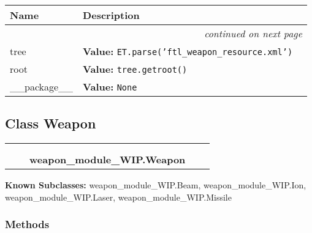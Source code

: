     \vspace{-1cm}
\hspace{\varindent}\begin{longtable}{|p{\varnamewidth}|p{\vardescrwidth}|l}
\cline{1-2}
\cline{1-2} \centering \textbf{Name} & \centering \textbf{Description}& \\
\cline{1-2}
\endhead\cline{1-2}\multicolumn{3}{r}{\small\textit{continued on next page}}\\\endfoot\cline{1-2}
\endlastfoot\raggedright t\-r\-e\-e\- & \raggedright \textbf{Value:} 
{\tt ET.parse('ftl\_weapon\_resource.xml')}&\\
\cline{1-2}
\raggedright r\-o\-o\-t\- & \raggedright \textbf{Value:} 
{\tt tree.getroot()}&\\
\cline{1-2}
\raggedright \_\-\_\-p\-a\-c\-k\-a\-g\-e\-\_\-\_\- & \raggedright \textbf{Value:} 
{\tt None}&\\
\cline{1-2}
\end{longtable}



\subsection{Class Weapon}

    \label{weapon_module_WIP:Weapon}
\begin{tabular}{cccccc}
\multicolumn{2}{r}{\settowidth{\BCL}{object}\multirow{2}{\BCL}{object}}
&&
  \\\cline{3-3}
  &&\multicolumn{1}{c|}{}
&&
  \\
&&\multicolumn{2}{l}{\textbf{weapon\_module\_WIP.Weapon}}
\end{tabular}

\textbf{Known Subclasses:}
weapon\_module\_WIP.Beam,
    weapon\_module\_WIP.Ion,
    weapon\_module\_WIP.Laser,
    weapon\_module\_WIP.Missile



  \subsubsection{Methods}

